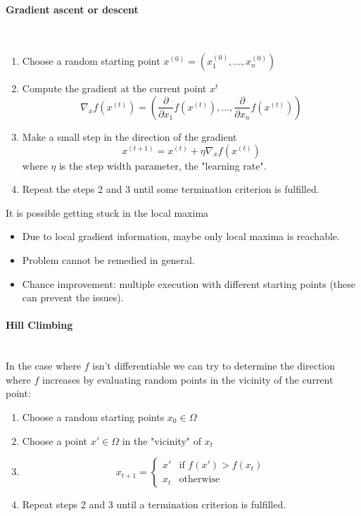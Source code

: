 \documentclass{article}
\begin{document}
\paragraph{Gradient ascent or descent}\mbox{}\\
\begin{enumerate}
    \item Choose a random starting point $x^{(0)}=\left(x_1^{(0)},\dots,x_n^{(0)}\right)$
    \item Compute the gradient at the current point $x^{t}$
          $$\nabla_x f\left(x^{(t)}\right)=\left(\frac{\partial}{\partial x_1}f\left(x^{(t)}\right),\dots,\frac{\partial}{\partial x_n}f\left(x^{(t)}\right)\right)$$
    \item Make a small step in the direction of the gradient
          $$x^{(t+1)}=x^{(t)}+\eta\nabla_x f\left(x^{(t)}\right)$$
          where $\eta$ is the step width parameter, the "learning rate".
    \item Repeat the steps 2 and 3 until some termination criterion is fulfilled.
\end{enumerate}
It is possible getting stuck in the local maxima
\begin{itemize}
    \item Due to local gradient information, maybe only local maxima is reachable.
    \item Problem cannot be remedied in general.
    \item Chance improvement: multiple execution with different starting points (these
          can prevent the issues).
\end{itemize}

\paragraph{Hill Climbing}\mbox{}\\
In the case where $f$ isn't differentiable we can try to determine the direction where $f$
increases by evaluating random points in the vicinity of the current point:
\begin{enumerate}
    \item Choose a random starting points $x_0\in\Omega$
    \item Choose a point $x'\in\Omega$ in the "vicinity" of $x_t$
    \item \[
              x_{t+1}=
              \begin{cases}
                  x'  & \text{if }f(x')> f(x_t) \\
                  x_t & \text{otherwise}
              \end{cases}
          \]
    \item Repeat steps 2 and 3 until a termination criterion is fulfilled.
\end{enumerate}
\end{document}
